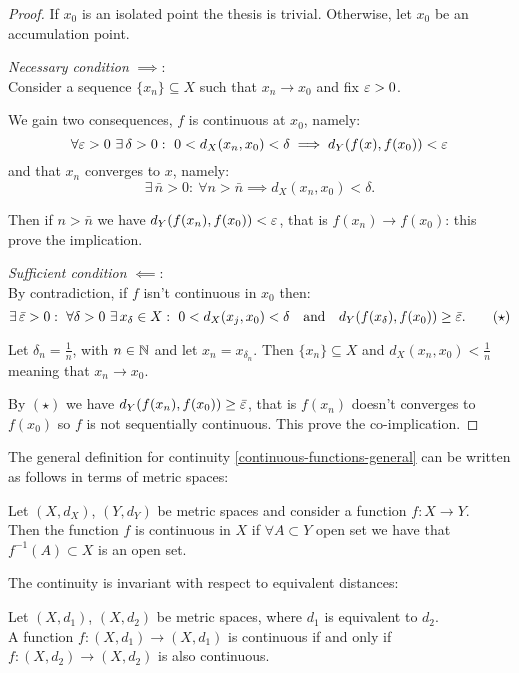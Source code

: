 \begin{proof}
	If $x_0$ is an isolated point the thesis is trivial. Otherwise, let $x_0$ be an accumulation point.
	
	\textit{Necessary condition} $\implies$:\\
	Consider a sequence $\{x_n\} \subseteq X$ such that $x_n \to x_0$ and fix $\varepsilon > 0$.
	
	We gain two consequences, $f$ is continuous at $x_0$, namely: 
	$$
		\forall \varepsilon > 0 
		\ \exists \, \delta > 0:
		\ 0<d_X(x_n, x_0) < \delta 
		\implies d_Y(f(x), f(x_0)) < \varepsilon
	$$ 
	and that $x_n$ converges to $x$, namely: 
	$$\exists \, \bar{n} > 0: \ \forall n > \bar{n} \implies d_X(x_n,x_0) < \delta.$$
	
	Then if $n > \bar{n}$ we have $d_Y(f(x_n),f(x_0)) < \varepsilon$, that is $f(x_n) \to f(x_0)$: this prove the implication.
	
	\textit{Sufficient condition} $\impliedby$:\\
	By contradiction, if $f$ isn't continuous in $x_0$ then:
	\[
		\exists \, \bar{\varepsilon} > 0 :
		\ \forall \delta > 0 
		\ \exists \, x_\delta \in X :
		\ 0<d_X(x_j, x_0) < \delta
		\quad \text{and} 
		\quad d_Y(f(x_\delta), f(x_0)) \geq \bar{\varepsilon}
	. 
	\tag{$\star$}
	\]
	
	Let $\delta_n = \frac 1 n$, with $n\in\mathbb N$ and let $x_n = x_{\delta_n}$. Then $\{x_n\}\subseteq X$ and $d_X(x_n,x_0)<\frac 1 n$ meaning that $x_n \to x_0$.
	
	By $(\star)$ we have $d_Y(f(x_n),f(x_0))\geq \bar{\varepsilon}$, that is $f(x_n)$ doesn't converges to $f(x_0)$ so $f$ is not sequentially continuous. This prove the co-implication.
\end{proof}

The general definition for continuity \vref{continuous-functions-general} can be written as follows in terms of metric spaces:
\begin{theo}\label{continuous-functions-general-metric}
	Let $(X, d_X)$, $(Y, d_Y)$ be metric spaces and consider a function $f: X \to Y$.\\
	Then the function $f$ is continuous in $X$ if $\forall A \subset Y$ open set we have that $f^{-1}(A) \subset X$ is an open set.
\end{theo} 

The continuity is invariant with respect to equivalent distances:
\begin{prop}
	Let $(X, d_1)$, $(X, d_2)$ be metric spaces, where $d_1$ is equivalent to $d_2$. \\
	A function $f: (X, d_1) \to (X, d_1)$ is continuous if and only if $f: (X, d_2) \to (X, d_2)$ is also continuous.
\end{prop}

